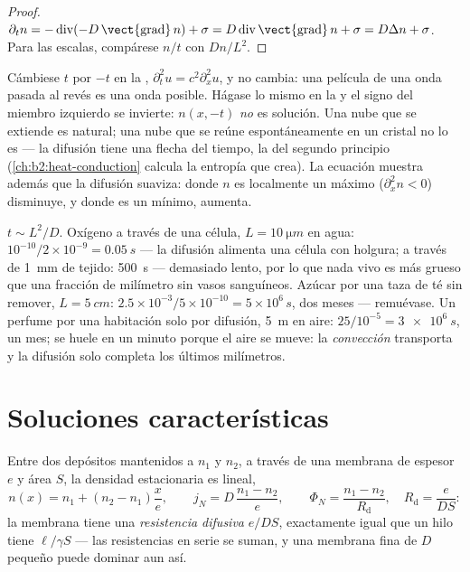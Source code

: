 \begin{proof}
$\partial_t n = -\operatorname{div}(-D\,\vect{\operatorname{grad}}\,n) +
\sigma = D\operatorname{div}\vect{\operatorname{grad}}\,n + \sigma = D\Delta
n + \sigma$. Para las escalas, compárese $n/t$ con $Dn/L^2$.
\end{proof}

\begin{remark}\label{rem:b2:particle-diffusion:irreversible}
Cámbiese $t$ por $-t$ en la , $\partial_t^2 u = c^2
\partial_x^2 u$, y no cambia: una película de una onda pasada al revés es
una onda posible. Hágase lo mismo en la  y el signo del
miembro izquierdo se invierte: $n(x,-t)$ \emph{no} es solución. Una nube que
se extiende es natural; una nube que se reúne espontáneamente en un cristal
no lo es --- la difusión tiene una flecha del tiempo, la del segundo principio
(\cref{ch:b2:heat-conduction} calcula la entropía que crea). La
ecuación muestra además que la difusión suaviza: donde $n$ es localmente un
máximo ($\partial_x^2 n < 0$) disminuye, y donde es un mínimo,
aumenta.
\end{remark}

\begin{example}\label{ex:b2:particle-diffusion:times}
$t \sim L^2/D$. Oxígeno a través de una célula, $L = \qty{10}{\micro m}$ en agua:
$10^{-10}/2 \times 10^{-9} = \qty{0.05}{s}$ --- la difusión alimenta una célula con
holgura; a través de \qty{1}{mm} de tejido: \qty{500}{s} --- demasiado lento, por lo que
nada vivo es más grueso que una fracción de milímetro sin
vasos sanguíneos. Azúcar por una taza de té sin remover, $L = \qty{5}{cm}$:
$2.5 \times 10^{-3}/5 \times 10^{-10} = 5 \times 10^6\,\unit{s}$, dos meses
--- remuévase. Un perfume por una habitación solo por difusión, \qty{5}{m} en
aire: $25/10^{-5} = \qty{3e6}{s}$, un mes; se huele en un minuto
porque el aire se mueve: la \emph{convección} transporta y la difusión solo
completa los últimos milímetros.
\end{example}

\section{Soluciones características}

\begin{proposition}\label{prop:b2:particle-diffusion:membrane}
Entre dos depósitos mantenidos a $n_1$ y $n_2$, a través de una membrana de
espesor $e$ y área $S$, la densidad estacionaria es lineal,
\[
n(x) = n_1 + (n_2 - n_1)\frac{x}{e}, \qquad
j_N = D\,\frac{n_1 - n_2}{e}, \qquad
\Phi_N = \frac{n_1 - n_2}{R_{\text{d}}}, \quad R_{\text{d}} = \frac{e}{DS}:
\]
la membrana tiene una \emph{resistencia difusiva} $e/DS$, exactamente igual que un hilo
tiene $\ell/\gamma S$ --- las resistencias en serie se suman, y una membrana fina
de $D$ pequeño puede dominar aun así.
\end{proposition}

